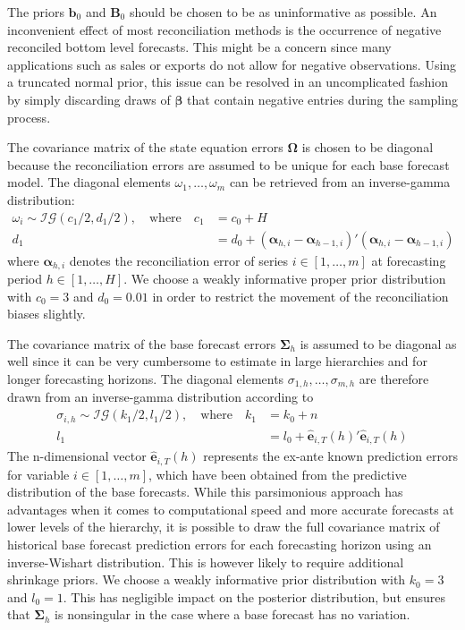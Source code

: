 \documentclass[a4paper,fleqn,11pt]{article}
\begin{document}
The priors $\textbf{b}_0$ and $\textbf{B}_0$ should be chosen to be as uninformative as possible. An inconvenient effect of most reconciliation methods is the occurrence of negative reconciled bottom level forecasts. This might be a concern since many applications such as sales or exports do not allow for negative observations. Using a truncated normal prior, this issue can be resolved in an uncomplicated fashion by simply discarding draws of $\boldsymbol{\beta}$ that contain negative entries during the sampling process.

The covariance matrix of the state equation errors $\boldsymbol{\Omega}$ is chosen to be diagonal because the reconciliation errors are assumed to be unique for each base forecast model. The diagonal elements $\omega_1, \hdots, \omega_m$ can be retrieved from an inverse-gamma distribution:
\begin{align*}
\omega_i \sim \mathcal{IG}(c_1/2,d_1/2), \quad \text{where} \quad c_1 &= c_0 + H\\
	d_1 &= d_0 + (\boldsymbol{\alpha}_{h,i} - \boldsymbol{\alpha}_{h-1,i})'(\boldsymbol{\alpha}_{h,i} - \boldsymbol{\alpha}_{h-1,i})
\end{align*}
where $\boldsymbol{\alpha}_{h,i}$ denotes the reconciliation error of series $i \in [1, \hdots, m]$ at forecasting period $h \in [1, \hdots, H]$. We choose a weakly informative proper prior distribution with $c_0 = 3$ and $d_0 = 0.01$ in order to restrict the movement of the reconciliation biases slightly. 

The covariance matrix of the base forecast errors $\boldsymbol{\Sigma}_h$ is assumed to be diagonal as well since it can be very cumbersome to estimate in large hierarchies and for longer forecasting horizons. The diagonal elements $\sigma_{1,h}, \hdots, \sigma_{m,h}$ are therefore drawn from an inverse-gamma distribution according to
\begin{align*}
	\sigma_{i,h} \sim \mathcal{IG}(k_1/2,l_1/2), \quad \text{where} \quad k_1 &= k_0 + n\\
	l_1 &= l_0 + \mathbf{\hat{e}}_{i,T}(h)'\mathbf{\hat{e}}_{i,T}(h)
\end{align*}
The n-dimensional vector $\mathbf{\hat{e}}_{i,T}(h)$ represents the ex-ante known prediction errors for variable $i \in [1, \hdots, m]$, which have been obtained from the predictive distribution of the base forecasts. While this parsimonious approach has advantages when it comes to computational speed and more accurate forecasts at lower levels of the hierarchy, it is possible to draw the full covariance matrix of historical base forecast prediction errors for each forecasting horizon using an inverse-Wishart distribution. This is however likely to require additional shrinkage priors. We choose a weakly informative prior distribution with $k_0 = 3$ and $l_0 = 1$. This has negligible impact on the posterior
distribution, but ensures that $\boldsymbol{\Sigma}_h$ is nonsingular in the case where a base forecast has no
variation.
\end{document}
